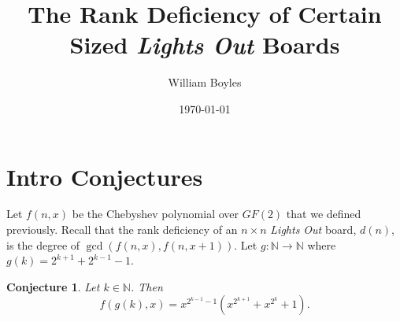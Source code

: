 \documentclass{article}
\newtheorem{conjecture}{Conjecture}
\newcommand{\N}{\mathbb{N}}
\begin{document}
	\title{The Rank Deficiency of Certain Sized \textit{Lights Out} Boards}
	\author{William Boyles}
	\date{\today}
	\maketitle
	
	\section{Intro Conjectures}
	Let $f(n,x)$ be the Chebyshev polynomial over $GF(2)$ that we defined previously.
	Recall that the rank deficiency of an $n \times n$ \textit{Lights Out} board, $d(n)$, is the degree of $\gcd(f(n,x), f(n,x+1))$.
	Let $g: \N \to \N$ where $g(k) = 2^{k+1} + 2^{k-1} - 1$.

	\begin{conjecture}
		\label{conj1}
		Let $k \in \N$.
		Then
		\begin{equation*}
			f(g(k), x) = x^{2^{k-1}-1}\left(x^{2^{k+1}}+x^{2^k}+1\right).
		\end{equation*}
	\end{conjecture}
\end{document}
